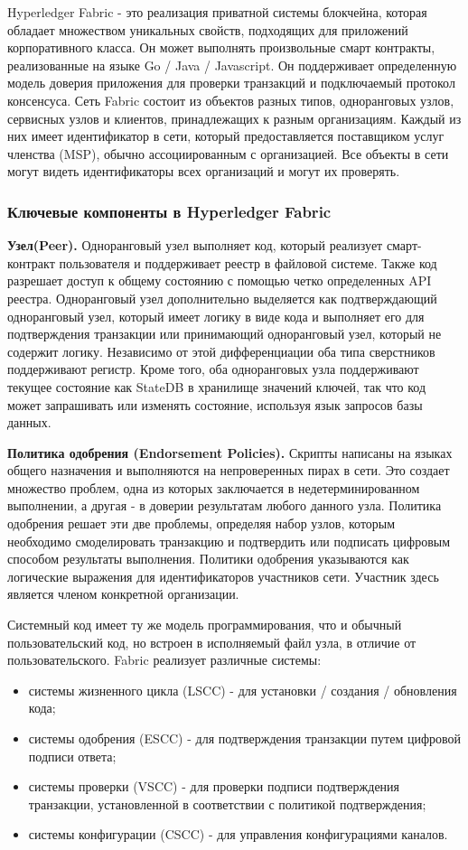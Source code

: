 Hyperledger Fabric - это реализация приватной системы блокчейна, которая обладает множеством уникальных свойств, подходящих для приложений корпоративного класса. Он может выполнять произвольные смарт контракты, реализованные на языке Go / Java / Javascript. Он поддерживает определенную модель доверия приложения для проверки транзакций и подключаемый протокол консенсуса. Сеть Fabric состоит из объектов разных типов, одноранговых узлов, сервисных узлов и клиентов, принадлежащих к разным организациям. Каждый из них имеет идентификатор в сети, который предоставляется поставщиком услуг членства (MSP), обычно ассоциированным с организацией. Все объекты в сети могут видеть идентификаторы всех организаций и могут их проверять.

\subsubsection{Ключевые компоненты в Hyperledger Fabric} \label{subsubsec:ch1/sec3/subsec1/subsubsec1}

\textbf{Узел(Peer).} Одноранговый узел выполняет код, который реализует смарт-контракт пользователя и поддерживает реестр в файловой системе. Также код разрешает доступ к общему состоянию с помощью четко определенных API реестра. Одноранговый узел дополнительно выделяется как подтверждающий одноранговый узел, который имеет логику в виде кода и выполняет его для подтверждения транзакции или принимающий одноранговый узел, который не содержит логику. Независимо от этой дифференциации оба типа сверстников поддерживают регистр. Кроме того, оба одноранговых узла поддерживают текущее состояние как StateDB в хранилище значений ключей, так что код может запрашивать или изменять состояние, используя язык запросов базы данных.

\textbf{Политика одобрения (Endorsement Policies).} Скрипты написаны на языках общего назначения и выполняются на непроверенных пирах в сети. Это создает множество проблем, одна из которых заключается в недетерминированном выполнении, а другая - в доверии результатам любого данного узла. Политика одобрения решает эти две проблемы, определяя набор узлов, которым необходимо смоделировать транзакцию и подтвердить или подписать цифровым способом результаты выполнения. Политики одобрения указываются как логические выражения для идентификаторов участников сети. Участник здесь является членом конкретной организации.

Системный код имеет ту же модель программирования, что и обычный пользовательский код, но встроен в исполняемый файл узла, в отличие от пользовательского. Fabric реализует различные системы:
\begin{itemize}
	\item системы жизненного цикла (LSCC) - для установки / создания / обновления кода;
	\item системы одобрения (ESCC) - для подтверждения транзакции путем цифровой подписи ответа;
	\item системы проверки (VSCC) - для проверки подписи подтверждения транзакции, установленной в соответствии с политикой подтверждения;
	\item системы конфигурации (CSCC) - для управления конфигурациями каналов.
\end{itemize}

